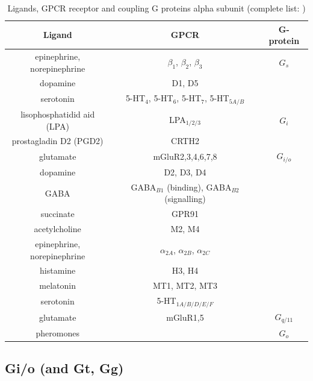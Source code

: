 \begin{table}[hbt]
\begin{center}
\caption{Ligands, GPCR receptor and coupling G proteins alpha subunit
(complete list: \citep{Wettschureck2005})}
\begin{tabular}{ccc} 
Ligand & GPCR & G-protein \\
  \hline\hline
epinephrine, norepinephrine  & $\beta_1$, $\beta_2$, $\beta_3$ & $G_s$ \\
dopamine & D1, D5 & \\
serotonin & 5-HT$_4$, 5-HT$_6$, 5-HT$_7$, 5-HT$_{5A/B}$ & \\

lisophosphatidid aid (LPA) & LPA$_{1/2/3}$ & $G_i$ \\
prostagladin D2 (PGD2) & CRTH2 & \\
 
glutamate & mGluR2,3,4,6,7,8 & $G_{i/o}$ \\
dopamine & D2, D3, D4 & \\
GABA & GABA$_{B1}$ (binding), GABA$_{B2}$ (signalling) & \\
succinate & GPR91 & \\
acetylcholine & M2, M4 &  \\
epinephrine, norepinephrine & $\alpha_{2A}$, $\alpha_{2B}$, $\alpha_{2C}$ & \\
histamine & H3, H4 & \\
melatonin & MT1, MT2, MT3 & \\
serotonin & 5-HT$_{1A/B/D/E/F}$ & \\ 

glutamate & mGluR1,5 & $G_{q/11}$ \\

pheromones & & $G_o$	\\
\hline
\end{tabular}
\end{center}
\label{tab:GPCR_ligand_Gprotein}
\end{table}




\subsection{Gi/o (and Gt, Gg)}
\label{sec:Gi/o-protein}
\label{sec:Go-protein}
\label{sec:Gi-protein}

